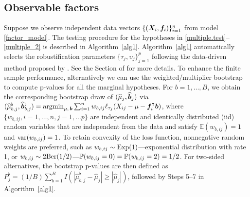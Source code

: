 \subsection{Observable factors}\label{sec:known_f}
Suppose we observe independent data vectors $\{ ( \bm{X}_i, \bm f_i ) \}_{i=1}^n$ from model \eqref{factor_model}. The testing procedure for the hypotheses in \eqref{multiple.test}--\eqref{multiple_2} is described in Algorithm~\ref{alg1}. Algorithm~\ref{alg1} automatically selects the robustification parameters $\{ \tau_j , \upsilon_j \}_{j=1}^p$ following the data-driven method proposed by \cite{KMRSZ2019}. See the Section of  for more details. To enhance the finite sample performance, alternatively we can use the weighted/multiplier bootstrap \citep{ZBFL2017,CZ2019} to compute p-values for all the marginal hypotheses. For $b=1,\ldots, B$, we obtain the corresponding bootstrap draw of $(\widehat \mu_j, \widehat {\bm{b}}_j)$ via $	(\widehat \mu^\flat_{b  , j} , \widehat{\bm{b}}^\flat_{b,j}) = \mathop{\mathrm{argmin}}_{\mu,  \, \bm{b} }  \sum_{i=1}^n w_{b,ij} \ell_{\tau_j}(X_{ij} - \mu - \bm f_i^\intercal \bm{b})$, where $\{ w_{b,ij} , i =1,\ldots, n, j=1,\ldots p \}$ are independent and identically distributed (iid) random variables that are independent from the data and satisfy $\mathbb{E}(w_{b,ij}) = 1$ and ${\rm var}(w_{b,ij})=1$. To retain convexity of the loss function, nonnegative random weights are preferred, such as $w_{b,ij} \sim {\rm Exp}(1)$---exponential distribution with rate 1, or $w_{b,ij} \sim 2 {\rm Ber}(1/2)$---$\mathbb{P}(w_{b,ij} = 0) = \mathbb{P}(w_{b,ij}=2) = 1/2$.
For two-sided alternatives, the bootstrap p-values  are then defined as $P^\flat_j= (1/B)\sum_{b=1}^B  I( | \hat \mu^\flat_{b,j} - \hat \mu_j  | \geq |\hat \mu_j |  )$, followed by Steps 5--7 in Algorithm~\ref{alg1}.




